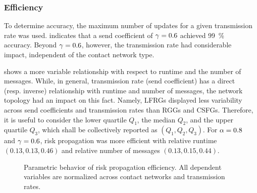 \subsubsection{Efficiency}

To determine accuracy, the maximum number of updates for a given transmission rate was used.  indicates that a send coefficient of $\gamma = \num{0.6}$ achieved \qty{99}{\percent} accuracy. Beyond $\gamma = \num{0.6}$, however, the transmission rate had considerable impact, independent of the contact network type.

 shows a more variable relationship with respect to runtime and the number of messages. While, in general, transmission rate (send coefficient) has a direct (resp. inverse) relationship with runtime and number of messages, the network topology had an impact on this fact. Namely, LFRGs displayed less variability across send coefficients and transmission rates than RGGs and CSFGs. Therefore, it is useful to consider the lower quartile $Q_1$, the median $Q_2$, and the upper quartile $Q_3$, which shall be collectively reported as $(Q_1, Q_2, Q_3)$. For $\alpha = \num{0.8} $ and $\gamma = \num{0.6}$, risk propagation was more efficient with relative runtime $(\num{0.13}, \num{0.13}, \num{0.46})$ and relative number of messages $(0.13, 0.15, 0.44)$.

\begin{figure}[htbp]
\centering
{}
\caption[Parametric behavior of risk propagation efficiency]{Parametric behavior of risk propagation efficiency. All dependent variables are normalized across contact networks and transmission rates.}
\label{fig:efficiency}
\end{figure}

